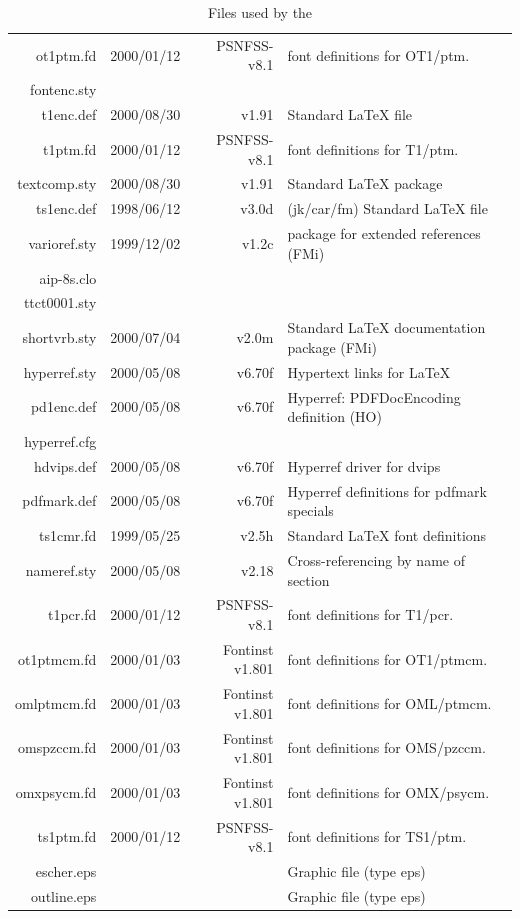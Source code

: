 \begin{table}[!t]
\begin{tabular}{rrrp{}}
  ot1ptm.fd  &  2000/01/12  &PSNFSS-v8.1 & font definitions for OT1/ptm. \\
 fontenc.sty & \\
   t1enc.def &   2000/08/30 & v1.91 &Standard LaTeX file \\
   t1ptm.fd  &  2000/01/12  &PSNFSS-v8.1 & font definitions for T1/ptm. \\
textcomp.sty &   2000/08/30 &v1.91 &Standard LaTeX package \\
  ts1enc.def &   1998/06/12 & v3.0d & (jk/car/fm) Standard LaTeX file \\
varioref.sty &   1999/12/02 &v1.2c &package for extended references (FMi) \\
  aip-8s.clo & \\
ttct0001.sty & \\
shortvrb.sty &   2000/07/04  &v2.0m & Standard LaTeX documentation package
 (FMi) \\
hyperref.sty &   2000/05/08  &v6.70f & Hypertext links for LaTeX \\
  pd1enc.def &   2000/05/08  &v6.70f & Hyperref: PDFDocEncoding definition
 (HO) \\
hyperref.cfg & \\
  hdvips.def &   2000/05/08  &v6.70f & Hyperref driver for dvips \\
 pdfmark.def &   2000/05/08  &v6.70f & Hyperref definitions for pdfmark
 specials \\
  ts1cmr.fd  &  1999/05/25  &v2.5h & Standard LaTeX font definitions \\
 nameref.sty &   2000/05/08  &v2.18 & Cross-referencing by name of section \\
   t1pcr.fd  &  2000/01/12  &PSNFSS-v8.1 & font definitions for T1/pcr. \\
ot1ptmcm.fd  &  2000/01/03  &Fontinst v1.801 & font definitions for
 OT1/ptmcm. \\
omlptmcm.fd  &  2000/01/03  &Fontinst v1.801 & font definitions for
 OML/ptmcm. \\
omspzccm.fd  &  2000/01/03  &Fontinst v1.801 & font definitions for
 OMS/pzccm. \\
omxpsycm.fd  &  2000/01/03 & Fontinst v1.801  &font definitions for
 OMX/psycm. \\
  ts1ptm.fd  &  2000/01/12 & PSNFSS-v8.1  &font definitions for TS1/ptm. \\
  escher.eps &   &&  Graphic file (type eps) \\
 outline.eps &  & &  Graphic file (type eps)  \\
\hline
\end{tabular}
\caption{Files used by the \aipcls{}}
\label{tab:b}

\end{table}


